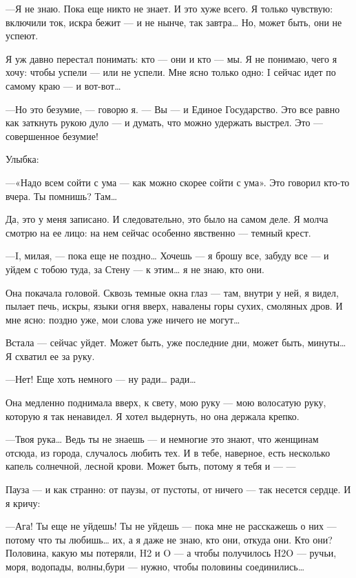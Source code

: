\documentclass[11pt,openany]{book}
\begin{document}
---Я не знаю. Пока еще никто не знает. И это хуже всего. Я только чувствую: включили ток, искра бежит --- и не нынче, так завтра\ldots{} Но, может быть, они не успеют.

Я уж давно перестал понимать: кто --- они и кто --- мы. Я не понимаю, чего я хочу: чтобы успели --- или не успели. Мне ясно только одно: I сейчас идет по самому краю --- и вот-вот\ldots{}

---Но это безумие, --- говорю я. --- Вы --- и Единое Государство. Это все равно как заткнуть рукою дуло --- и думать, что можно удержать выстрел. Это --- совершенное безумие!

Улыбка:

---«Надо всем сойти с ума --- как можно скорее сойти с ума». Это говорил кто-то вчера. Ты помнишь? Там\ldots{}

Да, это у меня записано. И следовательно, это было на самом деле. Я молча смотрю на ее лицо: на нем сейчас особенно явственно --- темный крест.

---I, милая, --- пока еще не поздно\ldots{} Хочешь --- я брошу все, забуду все --- и уйдем с тобою туда, за Стену --- к этим\ldots{} я не знаю, кто они.

Она покачала головой. Сквозь темные окна глаз --- там, внутри у ней, я видел, пылает печь, искры, языки огня вверх, навалены горы сухих, смоляных дров. И мне ясно: поздно уже, мои слова уже ничего не могут\ldots{}

Встала --- сейчас уйдет. Может быть, уже последние дни, может быть, минуты\ldots{} Я схватил ее за руку.

---Нет! Еще хоть немного --- ну ради\ldots{} ради\ldots{}

Она медленно поднимала вверх, к свету, мою руку --- мою волосатую руку, которую я так ненавидел. Я хотел выдернуть, но она держала крепко.

---Твоя рука\ldots{} Ведь ты не знаешь --- и немногие это знают, что женщинам отсюда, из города, случалось любить тех. И в тебе, наверное, есть несколько капель солнечной, лесной крови. Может быть, потому я тебя и --- ---

Пауза --- и как странно: от паузы, от пустоты, от ничего --- так несется сердце. И я кричу:

---Ага! Ты еще не уйдешь! Ты не уйдешь --- пока мне не расскажешь о них --- потому что ты любишь\ldots{} их, а я даже не знаю, кто они, откуда они. Кто они? Половина, какую мы потеряли, H2 и O --- а чтобы получилось H2O --- ручьи, моря, водопады, волны,бури --- нужно, чтобы половины соединились\ldots{}
\end{document}
